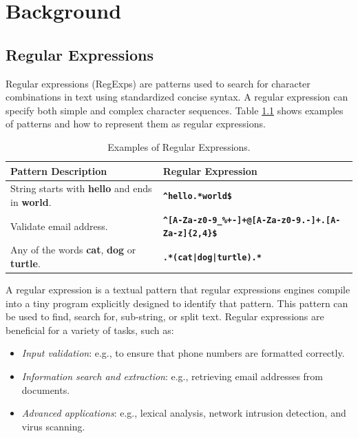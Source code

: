 \chapter{Background}\label{chapter:background}

\section{Regular Expressions}
Regular expressions (RegExps) are patterns used to search for character combinations in text using standardized concise syntax. A regular expression can specify both simple and complex character sequences. Table \ref{tab:regexsamp} shows examples of patterns and how to represent them as regular expressions.

{\renewcommand{\arraystretch}{1.6}%
\begin{table}[H]
\centering
\begin{adjustbox}{width=1.1\textwidth,center=\textwidth}
\small
\begin{tabular}{|l|l|}
\hline
Pattern Description       & Regular Expression  \\
\hline
String starts with \textbf{hello} and ends in \textbf{world}. & \texttt{\textbf{\^{}hello.*world\$}} \\
\hline
Validate email address. & \texttt{\textbf{\^{}[A-Za-z0-9\_\%+-]+@[A-Za-z0-9.-]+.[A-Za-z]\{2,4\}\$}} \\
\hline
Any of the words \textbf{cat}, \textbf{dog} or \textbf{turtle}. & \texttt{\textbf{.*(cat|dog|turtle).*}}\\
\hline
\end{tabular}
\end{adjustbox}
\caption{Examples of Regular Expressions.}\label{tab:regexsamp}
\end{table}}

A regular expression is a textual pattern that regular expressions engines compile into a tiny program explicitly designed to identify that pattern. This pattern can be used to find, search for, sub-string, or split text. Regular expressions are beneficial for a variety of tasks, such as:
 \begin{itemize}
     \item \textit{Input validation}: e.g., to ensure that phone numbers are formatted correctly.
     \item \textit{Information search and extraction}: e.g., retrieving email addresses from documents. \item \textit{Advanced applications}: e.g., lexical analysis, network intrusion detection, and virus scanning.
 \end{itemize}


